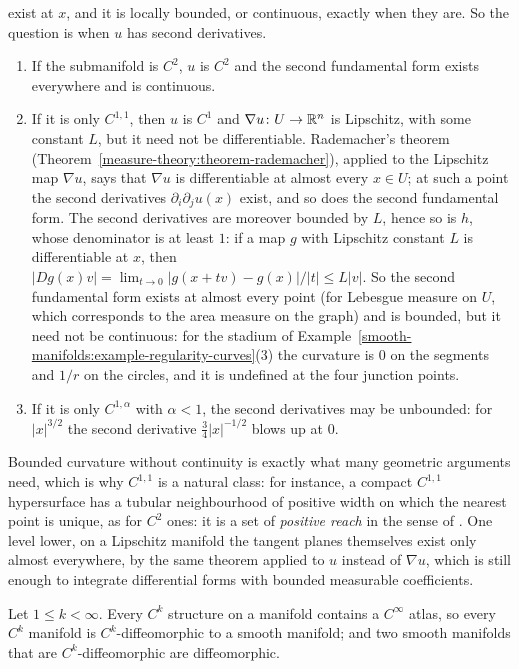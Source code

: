 \begin{remark}
exist at $x$, and it is locally bounded, or continuous, exactly when they are. So the question is when $u$ has second derivatives.
\begin{enumerate}
\item If the submanifold is $C^2$, $u$ is $C^2$ and the second fundamental form exists everywhere and is continuous.
\item If it is only $C^{1,1}$, then $u$ is $C^1$ and $\nabla u \colon U \to \mathbb{R}^n$ is Lipschitz, with some constant $L$, but it need not be differentiable. Rademacher's theorem
(Theorem~\ref{measure-theory:theorem-rademacher}), applied to the Lipschitz map $\nabla u$, says that $\nabla u$ is differentiable at almost every $x \in U$; at such a point the second derivatives
$\partial_i\partial_ju(x)$ exist, and so does the second fundamental form. The second derivatives are moreover bounded by $L$, hence so is $h$, whose denominator is at least $1$: if a map $g$ with Lipschitz constant $L$ is differentiable at $x$, then
$|Dg(x)v| = \lim_{t \to 0}|g(x + tv) - g(x)|/|t| \leq L|v|$. So the second fundamental form exists at almost every point (for Lebesgue measure on $U$, which corresponds to the area measure on the graph) and is bounded,
but it need not be continuous: for the stadium of Example~\ref{smooth-manifolds:example-regularity-curves}(3) the curvature is $0$ on the segments and $1/r$ on the circles, and it is undefined at the four junction points.
\item If it is only $C^{1,\alpha}$ with $\alpha < 1$, the second derivatives may be unbounded: for $|x|^{3/2}$ the second derivative $\frac34|x|^{-1/2}$ blows up at $0$.
\end{enumerate}
Bounded curvature without continuity is exactly what many geometric arguments need, which is why $C^{1,1}$ is a natural class: for instance, a compact $C^{1,1}$ hypersurface has a tubular neighbourhood of positive width
on which the nearest point is unique, as for $C^2$ ones: it is a set of \emph{positive reach} in the sense of \cite{federer-1959}. One level lower, on a Lipschitz manifold the tangent planes themselves exist only almost everywhere, by the same theorem applied to $u$ instead of $\nabla u$,
which is still enough to integrate differential forms with bounded measurable coefficients.
\end{remark}

\begin{theorem}[Whitney]\label{smooth-manifolds:theorem-whitney-smoothing}
Let $1 \leq k < \infty$. Every $C^k$ structure on a manifold contains a $C^\infty$ atlas, so every $C^k$ manifold is $C^k$-diffeomorphic to a smooth manifold; and two smooth manifolds that are $C^k$-diffeomorphic
are diffeomorphic.
\end{theorem}

